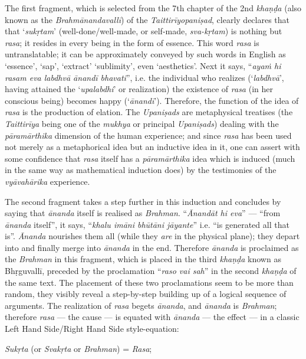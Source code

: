 The first fragment, which is selected from the 7th chapter of the 2nd \textsl{khaṇḍa} (also known as the \textsl{Brahmānandavallī}) of the \textsl{Taittirīyopaniṣad}, clearly declares that that ‘\textsl{sukṛtam}’ (well-done/well-made, or self-made, \textsl{sva-kṛtam}) is nothing but \textsl{rasa}; it resides in every being in the form of essence. This word \textsl{rasa} is untranslatable; it can be approximately conveyed by such words in English as ‘essence’, ‘sap’, ‘extract’ ‘sublimity’, even ‘aesthetics’. Next it says, “\textsl{ayaṁ hi rasam eva labdhvā ānandī bhavati}”, i.e. the individual who realizes (‘\textsl{labdhvā}’, having attained the ‘\textsl{upalabdhi}’ or realization) the existence of \textsl{rasa} (in her conscious being) becomes happy (‘\textsl{ānandī}’). Therefore, the function of the idea of \textsl{rasa} is the production of elation. The \textsl{Upaniṣads} are metaphysical treatises (the \textsl{Taittirīya} being one of the \textsl{mukhya} or principal \textsl{Upaniṣads}) dealing with the \textsl{pāramārthika} dimension of the human experience; and since \textsl{rasa} has been used not merely as a metaphorical idea but an inductive idea in it, one can assert with some confidence that \textsl{rasa} itself has a \textsl{pāramārthika} idea which is induced (much in the same way as mathematical induction does) by the testimonies of the \textsl{vyāvahārika} experience. 

The second fragment takes a step further in this induction and concludes by saying that \textsl{ānanda} itself is realised as \textsl{Brahman}. “\textsl{Ānandāt hi eva}” --- “from \textsl{ānanda} itself”, it says, “\textsl{khalu imāni bhūtāni jāyante}” i.e. “is generated all that is”. \textsl{Ānanda} nourishes them all (while they \textsl{are} in the physical plane); they depart into and finally merge into \textsl{ānanda} in the end. Therefore \textsl{ānanda} is proclaimed as the \textsl{Brahman} in this fragment, which is placed in the third \textsl{khaṇḍa} known as Bhṛguvallī, preceded by the proclamation “\textsl{raso vai sah}” in the second \textsl{khaṇḍa} of the same text. The placement of these two proclamations seem to be more than random, they visibly reveal a step-by-step building up of a logical sequence of arguments. The realization of \textsl{rasa} begets \textsl{ānanda}, and \textsl{ānanda} is \textsl{Brahman}; therefore \textsl{rasa} --- the cause --- is equated with \textsl{ānanda} --- the effect --- in a classic Left Hand Side/Right Hand Side style-equation: 

\textsl{Sukṛta} (or \textsl{Svakṛta} or \textsl{Brahman}) = \textsl{Rasa};

